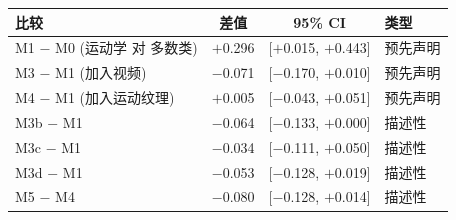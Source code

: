 \begin{tabular}{@{}l c c l@{}}
\toprule
比较 & 差值 & 95\% CI & 类型 \\
\midrule
M1 $-$ M0 (运动学 对 多数类) & $+$0.296 & [$+$0.015, $+$0.443] & 预先声明 \\
M3 $-$ M1 (加入视频) & $-$0.071 & [$-$0.170, $+$0.010] & 预先声明 \\
M4 $-$ M1 (加入运动纹理) & $+$0.005 & [$-$0.043, $+$0.051] & 预先声明 \\
M3b $-$ M1 & $-$0.064 & [$-$0.133, $+$0.000] & 描述性 \\
M3c $-$ M1 & $-$0.034 & [$-$0.111, $+$0.050] & 描述性 \\
M3d $-$ M1 & $-$0.053 & [$-$0.128, $+$0.019] & 描述性 \\
M5 $-$ M4 & $-$0.080 & [$-$0.128, $+$0.014] & 描述性 \\
\bottomrule
\end{tabular}
